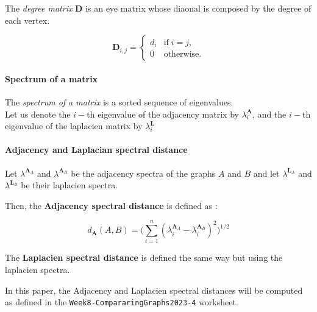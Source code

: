 \documentclass[english, 12pt]{article}
\begin{document}
The {\it degree matrix} $\mathbf D$ is an eye matrix whose diaonal is composed by the degree of each vertex.

$$\mathbf D_{i,j} =  \begin{cases}d_i&\text{if}\; i = j,\\0&\text{otherwise.}\end{cases}$$

\paragraph{Spectrum of a matrix}

The {\it spectrum of a matrix} is a sorted sequence of eigenvalues.\\
Let us denote the $i-$th eigenvalue of the adjacency matrix by $\lambda_i^{\mathbf A}$, and the $i-$th eigenvalue of the laplacien matrix by $\lambda_i^{\mathbf L}$

\paragraph{Adjacency and Laplacian spectral distance}
Let $\lambda^{\mathbf A_A}$ and  $\lambda^{\mathbf A_B}$ be the adjacency spectra of the graphs $A$ and $B$ and let $\lambda^{\mathbf L_A}$ and  $\lambda^{\mathbf L_B}$ be their laplacien spectra.

Then, the {\bf Adjacency spectral distance} is defined as :

$$d_{\mathbf A}(A,B) = \Bigg( \sum_{i=1}^n (\lambda_i^{\mathbf A_A} - \lambda_i^{\mathbf A_B})^2\Bigg)^{1/2}$$

The {\bf Laplacien spectral distance} is defined the same way but using the laplacien spectra.

In this paper, the Adjacency and Laplacien spectral distances will be computed as defined in the \texttt{Week8-CompararingGraphs2023-4} worksheet.


\printbibliography
\end{document}
